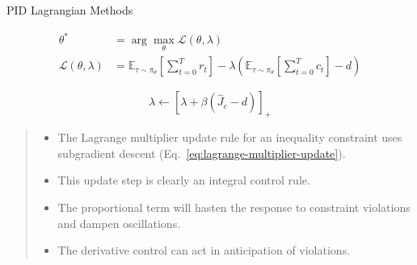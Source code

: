 \documentclass[8pt, aspectratio=169]{beamer} %
\begin{document}

\begin{frame}{\insertsubsectionhead}{PID Lagrangian Methods \cite{stooke2020responsive}}

  \begin{equation}
    \begin{aligned}
      \theta^* &= \arg\max_\theta \mathcal{L}(\theta, \lambda) \\
      \mathcal{L}(\theta, \lambda) &= \mathbb{E}_{\tau \sim \pi_\theta} \left[ \sum^T_{t = 0} r_t \right] - \lambda \left( \mathbb{E}_{\tau \sim \pi_\theta} \left[ \sum^T_{t = 0} c_t \right] - d \right)
    \end{aligned}
    \tag{3}
  \end{equation}

  \begin{equation}
    \lambda \leftarrow \left[ \lambda + \beta\left( \hat{J}_c - d \right) \right]_+
    \tag{4}
  \end{equation}

  \vspace{0.5cm}

  \begin{quote}
    \begin{itemize}
      \item The Lagrange multiplier update rule for an inequality constraint uses subgradient descent (Eq.~\ref{eq:lagrange-multiplier-update}).
      \item This update step is clearly an integral control rule.
      \item The proportional term will hasten the response to constraint violations and dampen oscillations.
      \item The derivative control can act in anticipation of violations.
    \end{itemize}
  \end{quote}
  
\end{frame}
\end{document}
